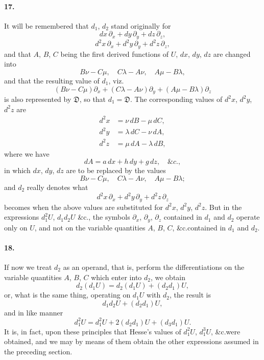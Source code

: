 \documentclass[12pt,a4paper]{article}
\theoremstyle{plain}
\begin{document}
\paragraph{17.}
It  will  be  remembered  that  $d_1$,  $d_2$  stand  originally  for
\[
dx\, \partial_x + dy\, \partial_y + dz\, \partial_z,
\]
\[
d^2x\, \partial_x + d^2y\, \partial_y + d^2z\, \partial_z,
\]
and  that  $A$,  $B$,  $C$  being  the  first  derived  functions  of  $U$,  $dx$,  $dy$,  $dz$  are  changed  into
\[
B\nu - C\mu, \quad C\lambda - A\nu, \quad A\mu - B\lambda,
\]
and  that  the  resulting  value  of  $d_1$,  viz.
\[
(B\nu - C\mu) \partial_x + (C\lambda - A\nu) \partial_y + (A\mu - B\lambda) \partial_z
\]
is  also  represented  by  $\mathfrak{D}$,  so  that  $d_1 = \mathfrak{D}$.     The  corresponding  values  of  $d^2x$,  $d^2y$,  $d^2z$  are
\begin{align*}
d^2x &= \nu\, dB - \mu\, dC, \\
d^2y &= \lambda\, dC - \nu\, dA, \\
d^2z &= \mu\, dA - \lambda\, dB,
\end{align*}
where  we  have
\[
dA = a\, dx + h\, dy + g\, dz, \quad \&c.,
\]
in  which  $dx$,  $dy$,  $dz$  are  to  be  replaced  by  the  values
\[
B\nu - C\mu, \quad C\lambda - A\nu, \quad A\mu - B\lambda;
\]
and  $d_2$  really  denotes  what
\[
d^2x\, \partial_x + d^2y\, \partial_y + d^2z\, \partial_z
\]
becomes  when  the  above  values  are  substituted  for  $d^2x$,  $d^2y$,  $d^2z$.  But  in  the  expressions
$d_1^2 U$,  $d_1 d_2 U$  \&c.,  the  symbols  $\partial_x$,  $\partial_y$,  $\partial_z$  contained  in  $d_1$  and  $d_2$  operate  only  on  $U$,  and
not  on  the  variable  quantities  $A$,  $B$,  $C$,  \&c.\@  contained  in  $d_1$  and  $d_2$.


\paragraph{18.}
If  now  we  treat  $d_2$  as  an  operand,  that  is,  perform  the  differentiations  on  the
variable  quantities  $A$,  $B$,  $C$  which  enter  into  $d_2$,  we  obtain
\[
d_2(d_1 U) = d_2(d_1 U) + (d_2 d_1)U,
\]
or,  what  is  the  same  thing,  operating  on  $d_1 U$  with  $d_2$,  the  result  is
\[
d_1 d_2 U + (d_2 d_1)U,
\]
and  in  like  manner
\[
d_1^2 U = d_1^2 U + 2(d_2 d_1)U + (d_3 d_1)U.
\]
It  is,  in  fact,  upon  these  principles  that  Hesse's  values  of  $d_1^2 U$,  $d_1^3 U$,  \&c.\@  were  obtained,
and  we  may  by  means  of  them  obtain  the  other  expressions  assumed  in  the  preceding
section.
\end{document}
